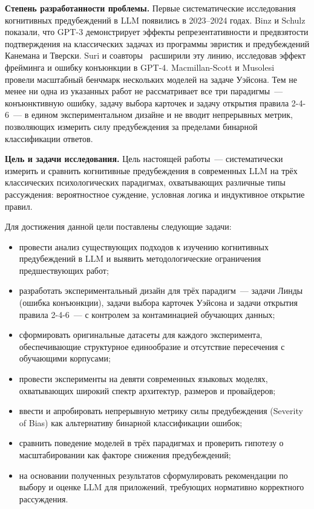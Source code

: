 \textbf{Степень разработанности проблемы.}
Первые систематические исследования когнитивных предубеждений в LLM появились в 2023--2024 годах. Binz и Schulz~\cite{binz2023using} показали, что GPT-3 демонстрирует эффекты репрезентативности и предвзятости подтверждения на классических задачах из программы эвристик и предубеждений Канемана и Тверски. Suri и соавторы~\cite{suri2024large} расширили эту линию, исследовав эффект фрейминга и ошибку конъюнкции в GPT-4. Macmillan-Scott и Musolesi~\cite{macmillan2024irrationality} провели масштабный бенчмарк нескольких моделей на задаче Уэйсона. Тем не менее ни одна из указанных работ не рассматривает все три парадигмы~--- конъюнктивную ошибку, задачу выбора карточек и задачу открытия правила 2-4-6~--- в едином экспериментальном дизайне и не вводит непрерывных метрик, позволяющих измерить силу предубеждения за пределами бинарной классификации ответов.

\textbf{Цель и задачи исследования.}
Цель настоящей работы~--- систематически измерить и сравнить когнитивные предубеждения в современных LLM на трёх классических психологических парадигмах, охватывающих различные типы рассуждения: вероятностное суждение, условная логика и индуктивное открытие правил.

Для достижения данной цели поставлены следующие задачи:
\begin{itemize}
  \item провести анализ существующих подходов к изучению когнитивных предубеждений в LLM и выявить методологические ограничения предшествующих работ;
  \item разработать экспериментальный дизайн для трёх парадигм~--- задачи Линды (ошибка конъюнкции), задачи выбора карточек Уэйсона и задачи открытия правила 2-4-6~--- с контролем за контаминацией обучающих данных;
  \item сформировать оригинальные датасеты для каждого эксперимента, обеспечивающие структурное единообразие и отсутствие пересечения с обучающими корпусами;
  \item провести эксперименты на девяти современных языковых моделях, охватывающих широкий спектр архитектур, размеров и провайдеров;
  \item ввести и апробировать непрерывную метрику силы предубеждения (Severity of Bias) как альтернативу бинарной классификации ошибок;
  \item сравнить поведение моделей в трёх парадигмах и проверить гипотезу о масштабировании как факторе снижения предубеждений;
  \item на основании полученных результатов сформулировать рекомендации по выбору и оценке LLM для приложений, требующих нормативно корректного рассуждения.
\end{itemize}

